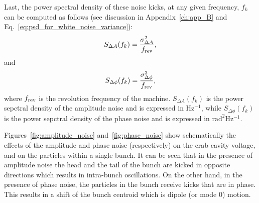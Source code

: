 Last, the power spectral density of these noise kicks, at any given frequency, $f_k$ can be computed as follows (see discussion in Appendix~\ref{ch:app_B} and Eq.~\eqref{eq:psd_for_white_noise_variance}):
\begin{equation}\label{eq:psd_for_white_noise_variance_AN}
    S_{\Delta A}(f_k) = \frac{\sigma_{\Delta A}^2 } {{f_\mathrm{rev}}},
 \end{equation}
 and
 \begin{equation}\label{eq:psd_for_white_noise_variance_PN}
    S_{\Delta \phi}(f_k) = \frac{\sigma_{\Delta \phi}^2 } {{f_\mathrm{rev}}},
 \end{equation}
 where ${f_\mathrm{rev}}$ is the revolution frequency of the machine. $S_{\Delta A}(f_k)$ is the power sepctral density of the amplitude noise and is expressed in Hz$^{-1}$, while $S_{\Delta \phi}(f_k)$ is the power sepctral density of the phase noise and is expressed in $\mathrm{rad^2 Hz^{-1}}$.





Figures~\ref{fig:amplitude_noise} and~\ref{fig:phase_noise} show schematically the effects of the amplitude and phase noise (respectively) on the crab cavity voltage, and on the particles within a single bunch. It can be seen that in the presence of amplitude noise the head and the tail of the bunch are kicked in opposite directions which results in intra-bunch oscillations. On the other hand, in the presence of phase noise, the particles in the bunch receive kicks that are in phase. This results in a shift of the bunch centroid which is dipole (or mode 0) motion.

